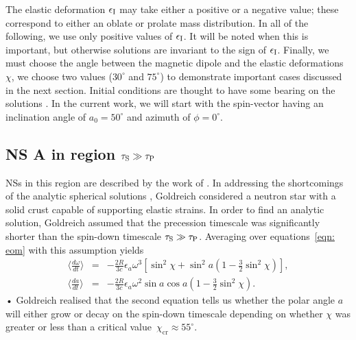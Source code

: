 \documentclass[../full_thesis/full_thesis.tex]{subfiles}
\begin{document}
The elastic deformation $\epsilon_{\mathrm{I}}$ may take either a positive or a negative
value; these correspond to either an oblate or prolate mass distribution.  In
all of the following, we use only positive values of $\epsilon_{\mathrm{I}}$. It will be noted
when this is important, but otherwise solutions are invariant to the sign of
$\epsilon_{\mathrm{I}}$. Finally, we must choose the angle between the magnetic dipole and the
elastic deformations $\chi$, we choose two values ($30^\circ$ and $75^\circ$)
to demonstrate important cases discussed in the next section. Initial
conditions are thought to have some bearing on the solutions
\citep[see][]{Melatos2000}. In the current work, we will start with the
spin-vector having an inclination angle of $a_0=50^{\circ}$ and azimuth of
$\phi=0^{\circ}$.


\subsection{NS A in region \texorpdfstring{$\tau_{\mathrm{S}}\gg \tau_{\mathrm{P}}$}{}}
\label{sec: A_NA}
NSs in this region are described by the work of \citet{Goldreich1970}. In
addressing the shortcomings of the analytic spherical solutions
\citep{Davis1970, Michel1970}, Goldreich considered a neutron star with a solid
crust capable of supporting elastic strains. In order to find an analytic
solution, Goldreich assumed that the precession timescale was significantly
shorter than the spin-down timescale $\tau_{\mathrm{S}} \gg \tau_{\mathrm{P}}$. Averaging
over equations~\eqref{eqn: eom} with this assumption yields
\begin{eqnarray}
\Big\langle \frac{d \omega}{dt}\Big\rangle & = & -\frac{2R}{3c}\epsilon_{a}\omega^{3}\left[ \sin^{2} \chi +\sin^{2}a \left(1-\frac{3}{2}\sin^{2}\chi\right)\right], \\
\Big\langle \frac{d a}{dt}\Big\rangle & = & -\frac{2R}{3c}\epsilon_{a}\omega^{2}\sin a \cos a \left(1-\frac{3}{2}\sin^{2}\chi\right).
\label{eqn: goldreich_averaged_eqns}
\end{eqnarray}•
Goldreich realised that the second equation tells us whether the polar angle $a$ will
either grow or decay on the spin-down timescale depending on whether $\chi$ was
greater or less than a critical value~$\chi_{\mathrm{\textrm{cr}}} \approx 55^{\circ}$.
\end{document}
